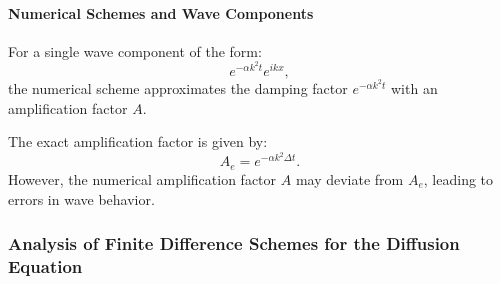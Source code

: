 \documentclass{article}
\begin{document}
			\paragraph{Numerical Schemes and Wave Components}
			For a single wave component of the form:
			\[
			e^{-\alpha k^2 t} e^{i k x},
			\]
			the numerical scheme approximates the damping factor \( e^{-\alpha k^2 t} \) with an amplification factor \( A \). 
			
			The exact amplification factor is given by:
			\[
			A_e = e^{-\alpha k^2 \Delta t}.
			\]
			However, the numerical amplification factor \( A \) may deviate from \( A_e \), leading to errors in wave behavior.
			

					
		\subsubsection{Analysis of Finite Difference Schemes for the Diffusion Equation}
		
\end{document}

